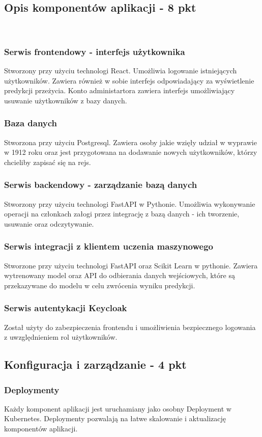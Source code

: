 \documentclass[12pt,a4paper]{article}
\begin{document}
\subsection{Opis komponentów aplikacji - 8 pkt}
\label{sec:FunctionalConditions} \\
\subsubsection{Serwis frontendowy - interfejs użytkownika}
Stworzony przy użyciu technologi React. Umożliwia logowanie istniejących użytkowników. Zawiera również w sobie interfejs odpowiadający za wyświetlenie predykcji przeżycia. Konto administartora zawiera interfejs umożliwiający usuwanie użytkowników z bazy danych.
\subsubsection{Baza danych} 
Stworzona przy użyciu Postgresql. Zawiera osoby jakie wzięły udział w wyprawie w 1912 roku oraz jest przygotowana na dodawanie nowych użytkowników, którzy chcieliby zapisać się na rejs. 
\subsubsection{Serwis backendowy - zarządzanie bazą danych} 
Stworzony przy użyciu technologi FastAPI w Pythonie. Umożliwia wykonywanie operacji na członkach załogi przez integrację z bazą danych - ich tworzenie, usuwanie oraz odczytywanie.
\subsubsection{Serwis integracji z klientem uczenia maszynowego} 
Stworzone przy użyciu technologi FastAPI oraz Scikit Learn w pythonie. Zawiera wytrenowany model oraz API do odbierania danych wejściowych, które są przekazywane do modelu w celu zwrócenia wyniku predykcji. 
\subsubsection {Serwis autentykacji Keycloak}  
Został użyty do zabezpieczenia frontendu i umożliwienia bezpiecznego logowania z uwzględnieniem rol użytkowników.
 
\subsection{Konfiguracja i zarządzanie - 4 pkt}
\label{sec:NonFunctionalConditions} 
\subsubsection {Deploymenty} 
Każdy komponent aplikacji jest uruchamiany jako osobny Deployment w Kubernetes. Deploymenty pozwalają na łatwe skalowanie i aktualizację komponentów aplikacji.
\end{document}
